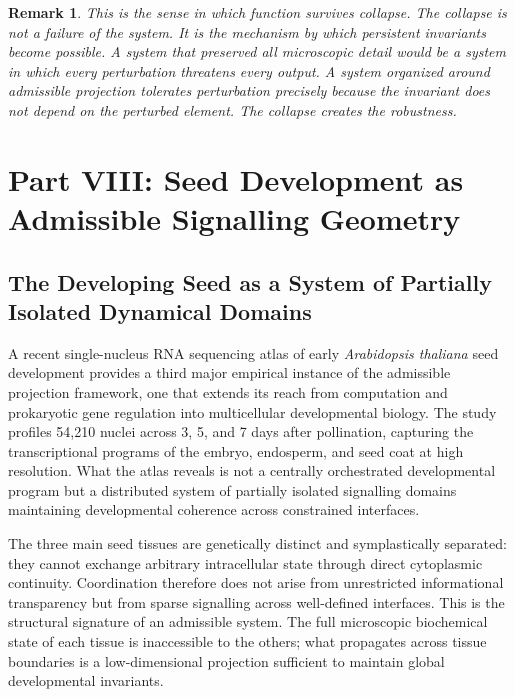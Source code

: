 \documentclass[12pt, a4paper]{article}
\theoremstyle{essaystyle}
\newtheorem*{remark}{Remark}
\begin{document}
\begin{remark}
This is the sense in which function survives collapse. The collapse is not a failure of
the system. It is the mechanism by which persistent invariants become possible. A system
that preserved all microscopic detail would be a system in which every perturbation
threatens every output. A system organized around admissible projection tolerates
perturbation precisely because the invariant does not depend on the perturbed element.
The collapse creates the robustness.
\end{remark}

\section{Part VIII: Seed Development as Admissible Signalling Geometry}

\subsection{The Developing Seed as a System of Partially Isolated Dynamical Domains}

A recent single-nucleus RNA sequencing atlas of early \textit{Arabidopsis thaliana} seed
development \citep{martin2026atlas} provides a third major empirical instance of the
admissible projection framework, one that extends its reach from computation and
prokaryotic gene regulation into multicellular developmental biology. The study profiles
54,210 nuclei across 3, 5, and 7 days after pollination, capturing the transcriptional
programs of the embryo, endosperm, and seed coat at high resolution. What the atlas
reveals is not a centrally orchestrated developmental program but a distributed system
of partially isolated signalling domains maintaining developmental coherence across
constrained interfaces.

The three main seed tissues are genetically distinct and symplastically separated:
they cannot exchange arbitrary intracellular state through direct cytoplasmic continuity.
Coordination therefore does not arise from unrestricted informational transparency
but from sparse signalling across well-defined interfaces. This is the structural
signature of an admissible system. The full microscopic biochemical state of each
tissue is inaccessible to the others; what propagates across tissue boundaries is a
low-dimensional projection sufficient to maintain global developmental invariants.
\end{document}

